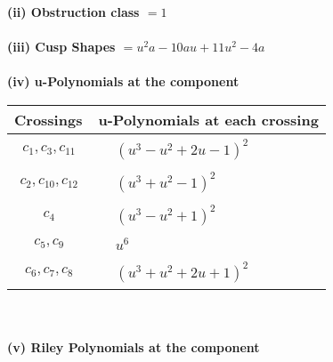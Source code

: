 \documentclass[1p]{elsarticle_modified}
\theoremstyle{definition}
\begin{document}
\flushleft \textbf{(ii) Obstruction class $= 1$}\\~\\
\flushleft \textbf{(iii) Cusp Shapes $= u^2 a-10 a u+11 u^2-4 a$}\\~\\
\newpage\renewcommand{\arraystretch}{1}
\flushleft \textbf{(iv) u-Polynomials at the component}\newline \\
\begin{tabular}{m{50pt}|m{274pt}}
Crossings & \hspace{64pt}u-Polynomials at each crossing \\
\hline $$\begin{aligned}c_{1},c_{3},c_{11}\end{aligned}$$&$\begin{aligned}
&(u^3- u^2+2 u-1)^2
\end{aligned}$\\
\hline $$\begin{aligned}c_{2},c_{10},c_{12}\end{aligned}$$&$\begin{aligned}
&(u^3+u^2-1)^2
\end{aligned}$\\
\hline $$\begin{aligned}c_{4}\end{aligned}$$&$\begin{aligned}
&(u^3- u^2+1)^2
\end{aligned}$\\
\hline $$\begin{aligned}c_{5},c_{9}\end{aligned}$$&$\begin{aligned}
&u^6
\end{aligned}$\\
\hline $$\begin{aligned}c_{6},c_{7},c_{8}\end{aligned}$$&$\begin{aligned}
&(u^3+u^2+2 u+1)^2
\end{aligned}$\\
\hline
\end{tabular}\\~\\
\newpage\renewcommand{\arraystretch}{1}
\flushleft \textbf{(v) Riley Polynomials at the component}\newline \\
\end{document}
